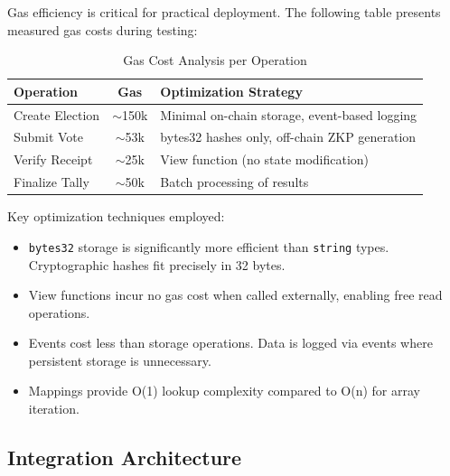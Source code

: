 \documentclass[conference]{IEEEtran}
\begin{document}
Gas efficiency is critical for practical deployment. The following table presents measured gas costs during testing:

\begin{table}[htbp]
\caption{Gas Cost Analysis per Operation}
\centering
\footnotesize
\begin{tabular}{|p{2.2cm}|c|p{3.5cm}|}
\hline
\textbf{Operation} & \textbf{Gas} & \textbf{Optimization Strategy} \\
\hline
Create Election & $\sim$150k & Minimal on-chain storage, event-based logging \\
\hline
Submit Vote & $\sim$53k & bytes32 hashes only, off-chain ZKP generation \\
\hline
Verify Receipt & $\sim$25k & View function (no state modification) \\
\hline
Finalize Tally & $\sim$50k & Batch processing of results \\
\hline
\end{tabular}
\label{tab:gas}
\end{table}

Key optimization techniques employed:
\begin{itemize}
    \item \texttt{bytes32} storage is significantly more efficient than \texttt{string} types. Cryptographic hashes fit precisely in 32 bytes.
    \item View functions incur no gas cost when called externally, enabling free read operations.
    \item Events cost less than storage operations. Data is logged via events where persistent storage is unnecessary.
    \item Mappings provide O(1) lookup complexity compared to O(n) for array iteration.
\end{itemize}

\subsection{Integration Architecture}
\end{document}
